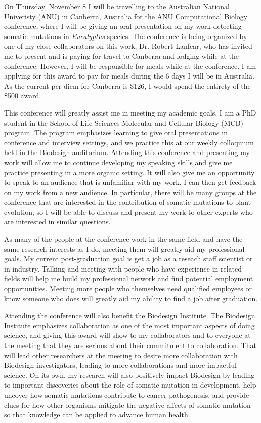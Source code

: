 \documentclass[12pt]{article}
\begin{document}
On Thursday, November 8 I will be travelling to the Australian National Univeristy (ANU) in Canberra, Australia for the ANU Computational Biology conference, where I will be giving an oral presentation on my work detecting somatic mutations in \textit{Eucalyptus} species. 
The conference is being organized by one of my close collaborators on this work, Dr. Robert Lanfear, who has invited me to present and is paying for travel to Canberra and lodging while at the conference. However, I will be responsible for meals while at the conference. I am applying for this award to pay for meals during the 6 days I will be in Australia. As the current per-diem for Canberra is \$126, I would spend the entirety of the \$500 award.

This conference will greatly assist me in meeting my academic goals. I am a PhD student in the School of Life Sciences Molecular and Cellular Biology (MCB) program. The program emphasizes learning to give oral presentations in conference and interview settings, and we practice this at our weekly colloquium held in the Biodesign auditorium. Attending this conference and presenting my work will allow me to continue developing my speaking skills and give me practice presenting in a more organic setting. It will also give me an opportunity to speak to an audience that is unfamiliar with my work. I can then get feedback on my work from a new audience. In particular, there will be many groups at the conference that are interested in the contribution of somatic mutations to plant evolution, so I will be able to discuss and present my work to other experts who are interested in similar questions.

As many of the people at the conference work in the same field and have the same research interests as I do, meeting them will greatly aid my professional goals. My current post-graduation goal is get a job as a reseach staff scientist or in industry. Talking and meeting with people who have experience in related fields will help me build my professional network and find potential employment opportunities. Meeting more people who themselves need qualified employees or know someone who does will greatly aid my ability to find a job after graduation.

Attending the conference will also benefit the Biodesign Institute. The Biodesign Institute emphasizes collaboration as one of the most important aspects of doing science, and giving this award will show to my collaborators and to everyone at the meeting that they are serious about their commitment to collaboration. That will lead other researchers at the meeting to desire more collaboration with Biodesign investigators, leading to more collaborations and more impactful science. On its own, my research will also positively impact Biodesign by leading to important discoveries about the role of somatic mutation in development, help uncover how somatic mutations contribute to cancer pathogenesis, and provide clues for how other organisms mitigate the negative affects of somatic mutation so that knowledge can be applied to advance human health.
\end{document}
